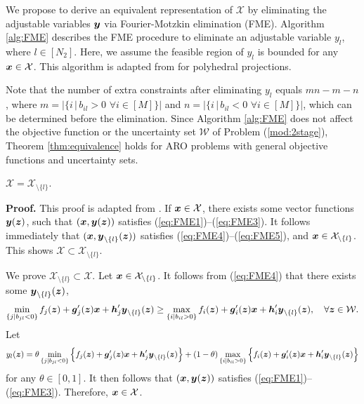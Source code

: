 \documentclass[fleqn,isre,blindrev]{informs4}
\newcommand{\mb}[1]{\mbox{\boldmath \ensuremath{#1}}}
\begin{document}
	We propose to derive an equivalent representation of $\mathcal{X}$ by eliminating the adjustable variables $\mb{y}$  via Fourier-Motzkin elimination (FME). Algorithm \ref{alg:FME} describes the FME procedure to eliminate an adjustable variable $y_{l}$, where $l\in [N_2]$. Here, we assume the feasible region of $y_{l}$ is bounded for any $\mb{x} \in \mathcal{X}$. This algorithm is adapted from \cite[page 72]{bt97} for polyhedral projections. 

{Note that the number of extra constraints after eliminating $y_l$ equals $mn - m-n$, where $m = |\{ i \, | \, b_{il} > 0 \,\,  \forall i\in [M] \}|$ and  $n = |\{ i \, | \, b_{il} < 0  \,\, \forall i\in [M] \}|$, which can be determined before the elimination.  Since Algorithm \ref{alg:FME} does not affect the objective function or the uncertainty set $\mathcal{W}$ of Problem (\ref{mod:2stage}), Theorem \ref{thm:equivalence} holds for ARO problems with general objective functions and uncertainty sets.	}

	\begin{theorem} \label{thm:equivalence}
		$\mathcal{X} =\mathcal{X}_{\setminus \{l\}}$.
	\end{theorem}
	\textbf{Proof.}
	This proof is adapted from \cite[page 73]{bt97}. If $\mb{x} \in \mathcal{X}$, there exists some vector functions $\mb{y}(\mb{z})$, such that $(\mb{x}, \mb{y}(\mb{z}))$ satisfies  (\ref{eq:FME1})--(\ref{eq:FME3}). It follows immediately that $(\mb{x}, \mb{y}_{\setminus \{l\}}(\mb{z}))$ satisfies (\ref{eq:FME4})--(\ref{eq:FME5}), and $\mb{x} \in \mathcal{X}_{  \setminus \{l\}}$. This shows $\mathcal{X}  \subset \mathcal{X}_{ \setminus \{l\}}$.

	We prove $\mathcal{X}_{ \setminus\{l\}}  \subset \mathcal{X}$. Let $\mb{x} \in \mathcal{X}_{ \setminus\{l\}}$. It follows from (\ref{eq:FME4}) that there exists some $\mb{y}_{\setminus \{l\}}(\mb{z})$,
\begin{equation*}
	\min_{\{j | b_{jl} < 0 \}}  	f_j(\mb{z}) + \mb{g}'_j(\mb{z})\mb{x} + \mb{h}'_j \mb{y}_{\setminus \{l\}}(\mb{z})  \ge \max_{\{i | b_{il} > 0\}}  f_i(\mb{z}) + \mb{g}'_i(\mb{z})\mb{x} + \mb{h}'_i \mb{y}_{ \setminus \{l\}}(\mb{z}), \quad \forall \mb{z}\in \mathcal{W}.
\end{equation*}
	Let 
\begin{equation*}
	y_{l}(\mb{z}) = \theta \min_{\{j | b_{jl} < 0 \}} \left\{ 	f_j(\mb{z}) + \mb{g}'_j(\mb{z})\mb{x} + \mb{h}'_j \mb{y}_{\setminus \{l\}}(\mb{z})\right\} + (1-\theta) \max_{\{i | b_{il} > 0\}} \left\{f_i(\mb{z}) + \mb{g}'_i(\mb{z})\mb{x} + \mb{h}'_i \mb{y}_{ \setminus \{l\}}(\mb{z})\right\} 
\end{equation*}
	for any $\theta \in [0,1]$. It then follows that $(\mb{x}, \mb{y}(\mb{z}))$ satisfies  (\ref{eq:FME1})--(\ref{eq:FME3}). Therefore, $\mb{x} \in \mathcal{X}$.
	 \hfill \Halmos \\
	 
\end{document}
